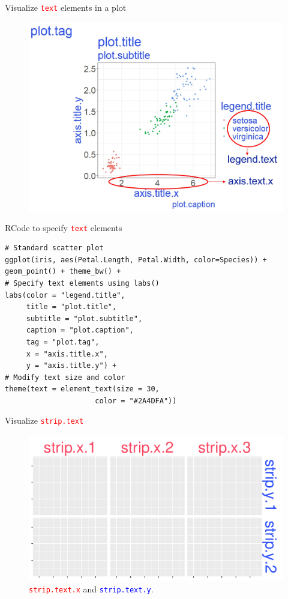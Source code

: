 \documentclass{beamer}
\begin{document}
\begin{frame}{Visualize \texttt{\textcolor{red}{text}} elements in a plot}
\begin{figure}
\includegraphics[width=0.99\linewidth]{PlotsLec3/TextThemeElements3}
\end{figure}
\end{frame}

\begin{frame}[fragile]{RCode to specify \texttt{\textcolor{red}{text}} elements}
\begin{lstlisting}
# Standard scatter plot
ggplot(iris, aes(Petal.Length, Petal.Width, color=Species)) +
geom_point() + theme_bw() +
# Specify text elements using labs()
labs(color = "legend.title",
     title = "plot.title",
     subtitle = "plot.subtitle",
     caption = "plot.caption",
     tag = "plot.tag",
     x = "axis.title.x",
     y = "axis.title.y") +
# Modify text size and color
theme(text = element_text(size = 30, 
                     color = "#2A4DFA"))
\end{lstlisting}
\end{frame}

\begin{frame}{Visualize \textcolor{red}{\texttt{strip.text}}}
\begin{figure}
\includegraphics[width=0.99\linewidth]{PlotsLec3/StripText}
\caption{{\small \textcolor{red}{\texttt{strip.text.x}} and \textcolor{blue}{\texttt{strip.text.y}}}.}
\end{figure}
\end{frame}
\end{document}
